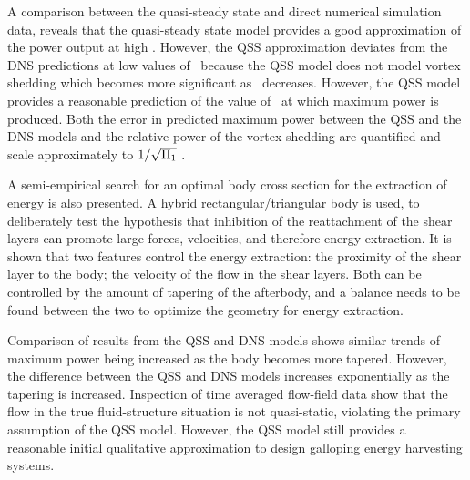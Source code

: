 A comparison between the quasi-steady state and direct numerical simulation data, reveals that the quasi-steady state model provides a good approximation of the power output at high \massstiff. However, the QSS approximation deviates from the DNS predictions at low values of \massstiff\ because the QSS model does not model vortex shedding which becomes more significant as \massstiff\ decreases. However, the QSS model provides a reasonable prediction of the value of \massdamp\ at which maximum power is produced. Both the error in predicted maximum power between the QSS and the DNS models and the relative power of the vortex shedding are quantified and scale approximately to $1/\sqrt{\Pi_1}$ .

A semi-empirical search for an optimal body cross section for the extraction of energy is also presented. A hybrid rectangular/triangular body is used, to deliberately test the hypothesis that inhibition of the reattachment of the shear layers can promote large forces, velocities, and therefore energy extraction. It is shown that two features control the energy extraction: the proximity of the shear layer to the body; the velocity of the flow in the shear layers. Both can be controlled by the amount of tapering of the afterbody, and a balance needs to be found between the two to optimize the geometry for energy extraction.

Comparison of results from the QSS and DNS models shows similar trends of maximum power being increased as the body becomes more tapered. However, the difference between the QSS and DNS models increases exponentially as the tapering is increased. Inspection of time averaged flow-field data show that the flow in the true fluid-structure situation is not quasi-static, violating the primary assumption of the QSS model. However, the QSS model still provides a reasonable initial qualitative approximation to design galloping energy harvesting systems. 
